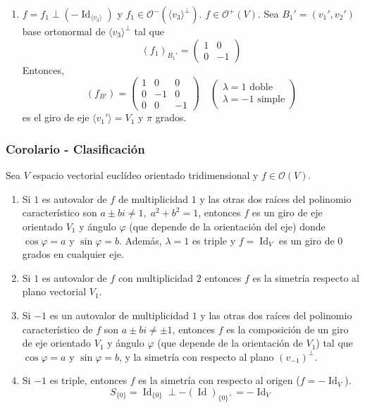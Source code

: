 \documentclass[12pt, a4paper, ones, notitlepage, openany,titlepage]{article}
\begin{document}
\begin{enumerate}[label=(\arabic*)]
	\item $f = f_1 \perp (-\operatorname{Id}_{\langle v_3 \rangle})$ y $f_1 \in \mathcal{O}^-(\langle v_3 \rangle^\perp)$. $f \in \mathcal{O}^+(V)$. Sea $B_1' = (v_1',v_2')$ base ortonormal de $\langle v_3 \rangle^\perp$ tal que 
	$$
	\left(f_1\right)_{B_1'} = \begin{pmatrix}
		1 & 0 \\
		0 & -1
	\end{pmatrix}
	$$
	Entonces,
	$$
	\left(f_{B'}\right) = \begin{pmatrix}
		1 & 0 & 0 \\
		0 & -1 & 0 \\
		0 & 0 & -1
	\end{pmatrix} \quad \begin{pmatrix}
		\lambda = 1 \text{ doble} \\
		\lambda = -1 \text{ simple}
	\end{pmatrix}
	$$
	es el giro de eje $\langle v_1' \rangle = V_1$ y $\pi$ grados.
\end{enumerate}

\subsubsection{Corolario - Clasificación}
\noindent Sea $V$ espacio vectorial euclídeo orientado tridimensional y $f \in \mathcal{O}(V)$.
\begin{enumerate}[label=(\arabic*)]
	\item Si $1$ es autovalor de $f$ de multiplicidad $1$ y las otras dos raíces del polinomio característico son $a \pm bi \neq 1, \; a^2 + b^2 = 1$, entonces $f$ es un giro de eje orientado $V_1$ y ángulo $\varphi$ (que depende de la orientación del eje) donde $\cos \varphi = a$ y $\sin \varphi = b$. Además, $\lambda = 1$ es triple y $f = \operatorname{Id}_V$ es un giro de $0$ grados en cualquier eje.
	
	\item Si $1$ es autovalor de $f$ con multiplicidad $2$ entonces $f$ es la simetría respecto al plano vectorial $V_1$.
	
	\item Si $-1$ es un autovalor de multiplicidad $1$ y las otras dos raíces del polinomio característico de $f$ son $a \pm bi \neq \pm 1$, entonces $f$ es la composición de un giro de eje orientado $V_1$ y ángulo $\varphi$ (que depende de la orientación de $V_1$) tal que $\cos \varphi = a$ y $\sin \varphi = b$, y la simetría con respecto al plano $(v_{-1})^\perp$.
	
	\item Si $-1$ es triple, entonces $f$ es la simetría con respecto al origen ($f = -\operatorname{Id}_V$).
	$$
	S_{\{0\}} = \operatorname{Id}_{\{0\}} \perp -(\operatorname{Id})_{\{0\}^\perp} = -\operatorname{Id}_V
	$$
\end{enumerate}
\end{document}
